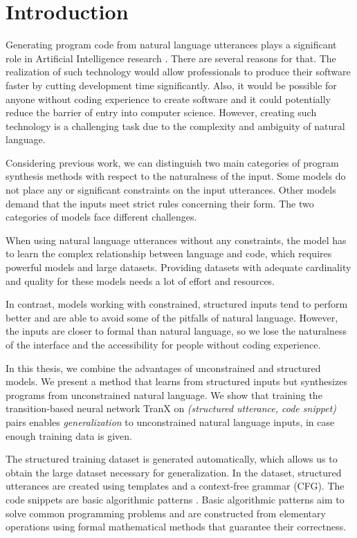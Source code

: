 \section{Introduction}
%
Generating program code from natural language utterances plays a significant
role in Artificial Intelligence research \cite{useful1, useful2, useful3}. There are several reasons for that. The realization of such technology would allow professionals to produce their
software faster by cutting development time significantly. Also, it would be
possible for anyone without coding experience to create software and it could
potentially reduce the barrier of entry into computer science. However, creating
such technology is a challenging task due to the complexity and ambiguity of
natural language. 

Considering previous work, we can distinguish two main categories of program
synthesis methods with respect to the naturalness of the input. Some models do
not place any or significant constraints on the input utterances. Other models
demand that the inputs meet strict rules concerning their form. The two
categories of models face different challenges.

When using natural language utterances without any constraints\cite{text1,
  text2}, the model has to learn the complex relationship between language and
code, which requires powerful models and large datasets. Providing datasets with
adequate cardinality and quality for these models needs a lot of effort and
resources.

In contrast, models working with constrained, structured inputs tend to perform
better and are able to avoid some of the pitfalls of natural language. However,
the inputs are closer to formal than natural language, so we lose the
naturalness of the interface and the accessibility for people without coding
experience.

In this thesis, we combine the advantages of unconstrained and structured models.
We present a method that learns from structured inputs but synthesizes programs
from unconstrained natural language. We show that training the transition-based
\cite{trans} neural network TranX \cite{tranx} on \emph{(structured utterance, code
snippet)} pairs enables \emph{generalization} to unconstrained natural language
inputs, in case enough training data is given.

The structured training dataset is generated automatically, which allows us to obtain the large dataset necessary for generalization. In the dataset, structured utterances are created using templates and a context-free grammar (CFG). The code snippets are basic algorithmic patterns \cite{progT}. Basic algorithmic patterns aim to solve common programming problems and are constructed from elementary operations using formal mathematical methods that guarantee their correctness. 


